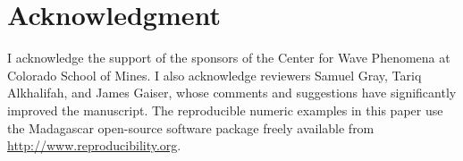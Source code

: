 
\section{Acknowledgment}
I acknowledge the support of the sponsors of the Center for Wave
Phenomena at Colorado School of Mines. I also acknowledge
reviewers Samuel Gray, Tariq Alkhalifah, and James Gaiser, whose
comments and suggestions have significantly improved the manuscript.
The reproducible numeric examples in this paper use the
Madagascar open-source software package freely available from
\url{http://www.reproducibility.org}.
